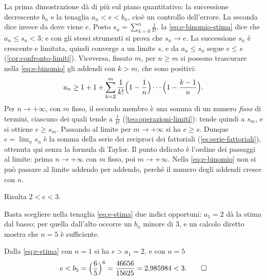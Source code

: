 \begin{osservazione}\label{oss:e-due-vie}
La prima dimostrazione dà di più sul piano quantitativo: la successione decrescente
$b_{n}$ e la tenaglia $a_{n}<e<b_{n}$, cioè un controllo dell'errore. La seconda dice
invece da dove viene $e$. Posto $s_{n}=\sum_{k=0}^{n}\frac1{k!}$, la
\eqref{eq:e-binomio-stima} dice che $a_{n}\le s_{n}<3$; e con gli stessi strumenti si
prova che $s_{n}\to e$. La successione $s_{n}$ è crescente e limitata, quindi converge a
un limite $s$, e da $a_{n}\le s_{n}$ segue $e\le s$ (\cref{cor:confronto-limiti}).
Viceversa, fissato $m$, per $n\ge m$ si possono trascurare nella \eqref{eq:e-binomio}
gli addendi con $k>m$, che sono positivi:
\[
  a_{n}\ge1+1+\sum_{k=2}^{m}\frac1{k!}\Bigl(1-\frac1n\Bigr)\cdots\Bigl(1-\frac{k-1}n\Bigr).
\]
Per $n\to+\infty$, con $m$ fisso, il secondo membro è una somma di un numero \emph{fisso}
di termini, ciascuno dei quali tende a $\frac1{k!}$ (\cref{teo:operazioni-limiti}):
tende quindi a $s_{m}$, e si ottiene $e\ge s_{m}$. Passando al limite per $m\to+\infty$
si ha $e\ge s$. Dunque $e=\lim_{n}s_{n}$ è la somma della serie dei reciproci dei
fattoriali (\cref{es:serie-fattoriali}), ottenuta qui senza la formula di Taylor. Il punto
delicato è l'ordine dei passaggi al limite: prima $n\to+\infty$ con $m$ fisso, poi
$m\to+\infty$. Nella \eqref{eq:e-binomio} non si può passare al limite addendo per
addendo, perché il numero degli addendi cresce con $n$.
\end{osservazione}

\begin{corollario}\label{cor:e-tra-2-e-3}
Risulta $2<e<3$.
\end{corollario}

\begin{schema}
\end{schema}

\begin{strategia}
Basta scegliere nella tenaglia \eqref{eq:e-stima} due indici opportuni: $a_{1}=2$ dà la
stima dal basso; per quella dall'alto occorre un $b_{n}$ minore di $3$, e un calcolo
diretto mostra che $n=5$ è sufficiente.
\end{strategia}

\begin{dimostrazione}
Dalla \eqref{eq:e-stima} con $n=1$ si ha $e>a_{1}=2$, e con $n=5$
\begin{equation}\label{eq:b5}
  e<b_{5}=\Bigl(\frac65\Bigr)^{6}=\frac{46656}{15625}=2{,}985984<3. \qedhere
\end{equation}
\end{dimostrazione}

